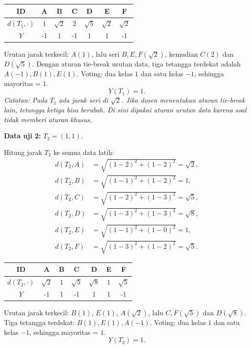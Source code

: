 \documentclass[a4paper,10pt,twocolumn]{article}
\newcommand{\catatan}[1]{\textit{Catatan: #1}}
\begin{document}
\begin{center}
\scriptsize
\begin{tabular}{c|cccccc}
\toprule
ID & A & B & C & D & E & F \\
\midrule
$d(T_1,\cdot)$ & $1$ & $\sqrt2$ & $2$ & $\sqrt5$ & $\sqrt2$ & $\sqrt2$ \\
$Y$ & -1 & 1 & -1 & 1 & 1 & -1 \\
\bottomrule
\end{tabular}
\end{center}

Urutan jarak terkecil: $A(1)$, lalu seri $B,E,F(\sqrt2)$, kemudian $C(2)$ dan $D(\sqrt5)$. Dengan aturan tie-break urutan data, tiga tetangga terdekat adalah $A(-1),B(1),E(1)$. Voting: dua kelas $1$ dan satu kelas $-1$, sehingga mayoritas = $1$.
\[
\boxed{Y(T_1)=1}.
\]
\catatan{Pada $T_1$ ada jarak seri di $\sqrt2$. Jika dosen menentukan aturan tie-break lain, tetangga ketiga bisa berubah. Di sini dipakai aturan urutan data karena soal tidak memberi aturan khusus.}

\textbf{Data uji 2:} $T_2=(1,1)$.

Hitung jarak $T_2$ ke semua data latih:
\[
\begin{aligned}
d(T_2,A)&=\sqrt{(1-2)^2+(1-2)^2}=\sqrt2,\\
d(T_2,B)&=\sqrt{(1-1)^2+(1-2)^2}=1,\\
d(T_2,C)&=\sqrt{(1-2)^2+(1-3)^2}=\sqrt5,\\
d(T_2,D)&=\sqrt{(1-3)^2+(1-3)^2}=\sqrt8,\\
d(T_2,E)&=\sqrt{(1-1)^2+(1-0)^2}=1,\\
d(T_2,F)&=\sqrt{(1-3)^2+(1-2)^2}=\sqrt5.
\end{aligned}
\]

\begin{center}
\scriptsize
\begin{tabular}{c|cccccc}
\toprule
ID & A & B & C & D & E & F \\
\midrule
$d(T_2,\cdot)$ & $\sqrt2$ & $1$ & $\sqrt5$ & $\sqrt8$ & $1$ & $\sqrt5$ \\
$Y$ & -1 & 1 & -1 & 1 & 1 & -1 \\
\bottomrule
\end{tabular}
\end{center}

Urutan jarak terkecil: $B(1)$, $E(1)$, $A(\sqrt2)$, lalu $C,F(\sqrt5)$ dan $D(\sqrt8)$. Tiga tetangga terdekat: $B(1),E(1),A(-1)$. Voting: dua kelas $1$ dan satu kelas $-1$, sehingga mayoritas = $1$.
\[
\boxed{Y(T_2)=1}.
\]
\end{document}
